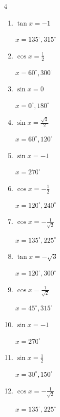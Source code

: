 \begin{multicols}{4}
\begin{enumerate}
  \item $\displaystyle \tan{x}  = -1$

        $\displaystyle x = 135^{\circ} , 315^{\circ}$

  \item $\displaystyle \cos{x}  = \frac{1}{2}$

        $\displaystyle x = 60^{\circ} , 300^{\circ}$

  \item $\displaystyle \sin{x}  = 0$

        $\displaystyle x = 0^{\circ} , 180^{\circ}$

  \item $\displaystyle \sin{x}  = \frac{\sqrt{3}}{2}$

        $\displaystyle x = 60^{\circ} , 120^{\circ}$

  \item $\displaystyle \sin{x}  = -1$

        $\displaystyle x = 270^{\circ}$

  \item $\displaystyle \cos{x}  = -\frac{1}{2}$

        $\displaystyle x = 120^{\circ} , 240^{\circ}$

  \item $\displaystyle \cos{x}  = -\frac{1}{\sqrt{2}}$

        $\displaystyle x = 135^{\circ} , 225^{\circ}$

  \item $\displaystyle \tan{x}  = -\sqrt{3}$

        $\displaystyle x = 120^{\circ} , 300^{\circ}$

  \item $\displaystyle \cos{x}  = \frac{1}{\sqrt{2}}$

        $\displaystyle x = 45^{\circ} , 315^{\circ}$

  \item $\displaystyle \sin{x}  = -1$

        $\displaystyle x = 270^{\circ}$

  \item $\displaystyle \sin{x}  = \frac{1}{2}$

        $\displaystyle x = 30^{\circ} , 150^{\circ}$

  \item $\displaystyle \cos{x}  = -\frac{1}{\sqrt{2}}$

        $\displaystyle x = 135^{\circ} , 225^{\circ}$


\end{enumerate}
\end{multicols}
